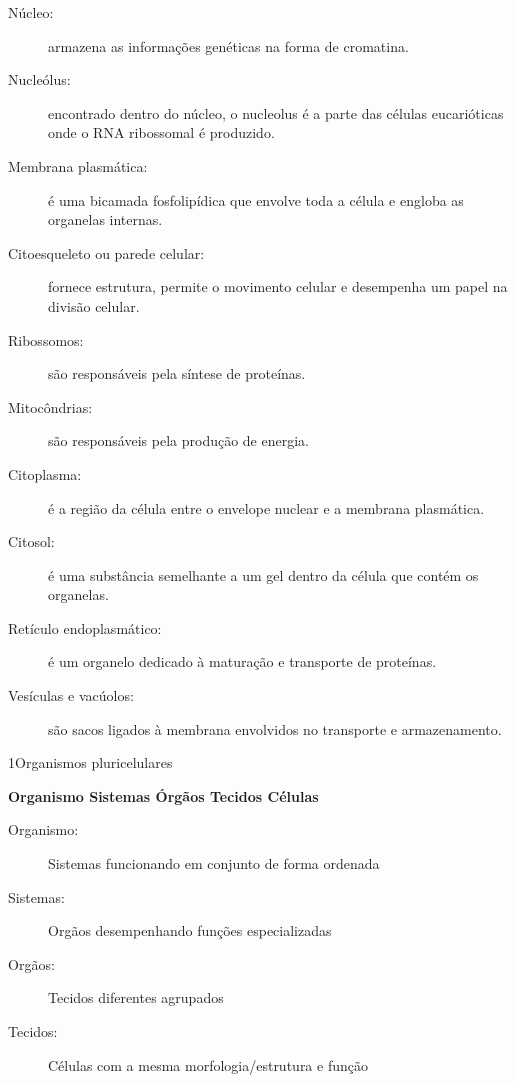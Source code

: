 \documentclass[\mainfilename]{subfiles}
\begin{document}
\begin{sectionBox}
\begin{sectionBox}
        \begin{description}
            \item[Núcleo:] armazena as informações genéticas na forma de cromatina.

            \item[Nucleólus:] encontrado dentro do núcleo, o nucleolus é a parte das células eucarióticas onde o RNA ribossomal é produzido.

            \item[Membrana plasmática:] é uma bicamada fosfolipídica que envolve toda a célula e engloba as organelas internas.

            \item[Citoesqueleto ou parede celular:] fornece estrutura, permite o movimento celular e desempenha um papel na divisão celular.

            \item[Ribossomos:] são responsáveis pela síntese de proteínas.

            \item[Mitocôndrias:] são responsáveis pela produção de energia.

            \item[Citoplasma:] é a região da célula entre o envelope nuclear e a membrana plasmática.

            \item[Citosol:] é uma substância semelhante a um gel dentro da célula que contém os organelas.

            \item[Retículo endoplasmático:] é um organelo dedicado à maturação e transporte de proteínas.

            \item[Vesículas e vacúolos:] são sacos ligados à membrana envolvidos no transporte e armazenamento. 
        \end{description}

    \end{sectionBox}
    
\end{sectionBox}

\begin{sectionBox}1{Organismos pluricelulares} %
    
    \begin{center}\bfseries
        Organismo
        \quad\leftarrow\quad Sistemas
        \quad\leftarrow\quad Órgãos
        \quad\leftarrow\quad Tecidos
        \quad\leftarrow\quad Células
    \end{center}

    \begin{description}
        \item[Organismo:] Sistemas funcionando em conjunto de forma ordenada
        \item[Sistemas:] Orgãos desempenhando funções especializadas
        \item[Orgãos:] Tecidos diferentes agrupados
        \item[Tecidos:] Células com a mesma morfologia/estrutura e função
    \end{description}
    
\end{sectionBox}
\end{document}
